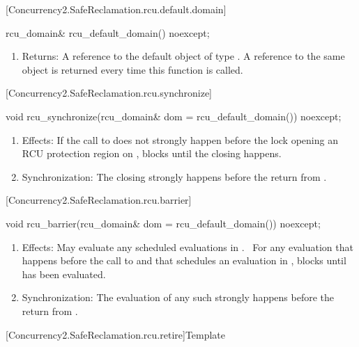 [Concurrency2.SafeReclamation.rcu.default.domain]{}

\begin{codeblock}
rcu_domain& rcu_default_domain() noexcept;
\end{codeblock}

\begin{enumerate}
\item	Returns: A reference to the default object of type .
	A reference to the same object is returned every time this
	function is called.
\end{enumerate}

[Concurrency2.SafeReclamation.rcu.synchronize]{}

\begin{codeblock}
void rcu_synchronize(rcu_domain& dom = rcu_default_domain()) noexcept;
\end{codeblock}

\begin{enumerate}
\item	Effects: If the call to  does not strongly
	happen before the lock opening an RCU protection region 
	on , blocks until the  closing 
	happens.
\item	Synchronization: The  closing  strongly
	happens before the return from .
\end{enumerate}

[Concurrency2.SafeReclamation.rcu.barrier]{}

\begin{codeblock}
void rcu_barrier(rcu_domain& dom = rcu_default_domain()) noexcept;
\end{codeblock}

\begin{enumerate}
\item	Effects: May evaluate any scheduled evaluations in
	.  For any evaluation that happens before the call
	to  and that schedules an evaluation 
	in , blocks until  has been evaluated.  
\item	Synchronization: The evaluation of any such  strongly
	happens before the return from .
\end{enumerate}

[Concurrency2.SafeReclamation.rcu.retire]{Template }

